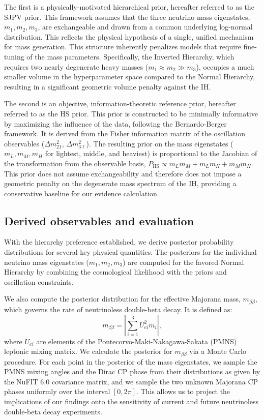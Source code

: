 \documentclass[]{article}
\begin{document}
The first is a physically-motivated hierarchical prior, hereafter referred to as the SJPV prior. This framework assumes that the three neutrino mass eigenstates, $m_1, m_2, m_3$, are exchangeable and drawn from a common underlying log-normal distribution. This reflects the physical hypothesis of a single, unified mechanism for mass generation. This structure inherently penalizes models that require fine-tuning of the mass parameters. Specifically, the Inverted Hierarchy, which requires two nearly degenerate heavy masses ($m_1 \approx m_2 \gg m_3$), occupies a much smaller volume in the hyperparameter space compared to the Normal Hierarchy, resulting in a significant geometric volume penalty against the IH.

The second is an objective, information-theoretic reference prior, hereafter referred to as the HS prior. This prior is constructed to be minimally informative by maximizing the influence of the data, following the Bernardo-Berger framework. It is derived from the Fisher information matrix of the oscillation observables ($\Delta m^2_{21}$, $\Delta m^2_{3\ell}$). The resulting prior on the mass eigenstates ($m_L, m_M, m_H$ for lightest, middle, and heaviest) is proportional to the Jacobian of the transformation from the observable basis, $P_{\text{HS}} \propto m_L m_M + m_L m_H + m_M m_H$. This prior does not assume exchangeability and therefore does not impose a geometric penalty on the degenerate mass spectrum of the IH, providing a conservative baseline for our evidence calculation.

\subsection{Derived observables and evaluation}
With the hierarchy preference established, we derive posterior probability distributions for several key physical quantities. The posteriors for the individual neutrino mass eigenstates ($m_1, m_2, m_3$) are computed for the favored Normal Hierarchy by combining the cosmological likelihood with the priors and oscillation constraints.

We also compute the posterior distribution for the effective Majorana mass, $m_{\beta\beta}$, which governs the rate of neutrinoless double-beta decay. It is defined as:
\begin{equation}
m_{\beta\beta} = \left| \sum_{i=1}^{3} U_{ei}^2 m_i \right|,
\end{equation}
where $U_{ei}$ are elements of the Pontecorvo-Maki-Nakagawa-Sakata (PMNS) leptonic mixing matrix. We calculate the posterior for $m_{\beta\beta}$ via a Monte Carlo procedure. For each point in the posterior of the mass eigenstates, we sample the PMNS mixing angles and the Dirac CP phase from their distributions as given by the NuFIT 6.0 covariance matrix, and we sample the two unknown Majorana CP phases uniformly over the interval $[0, 2\pi]$. This allows us to project the implications of our findings onto the sensitivity of current and future neutrinoless double-beta decay experiments.
\end{document}
